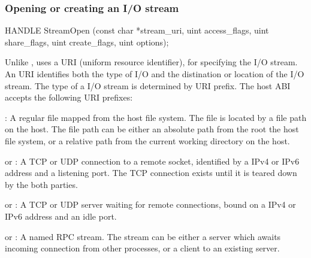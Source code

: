 \subsubsection*{Opening or creating an I/O stream}




\begin{paldef}
HANDLE StreamOpen (const char *stream_uri,
                   uint access_flags, uint share_flags,
                   uint create_flags, uint options);
\end{paldef}



Unlike ,  uses a URI (uniform resource identifier), for specifying the I/O stream.
An URI identifies both the type of I/O and the distination or location of the I/O stream.
The type of a I/O stream is determined by URI prefix.
The host ABI accepts the following URI prefixes:



\begin{compactitem}

\item {}: A regular file mapped from the host file system. The file is located by a file path on the host. The file path can be either an absolute path from the root the host file system, or a relative path from the current working directory on the host.

\item {} or : A TCP or UDP connection to a remote socket, identified by a IPv4 or IPv6 address and a listening port. The TCP connection exists until it is teared down by the both parties.

\item {} or : A TCP or UDP server waiting for remote connections, bound on a IPv4 or IPv6 address and an idle port.

\item {} or : A named RPC stream.
The stream can be either a server which awaits incoming connection from other processes,
or a client to an existing server.

\end{compactitem}



